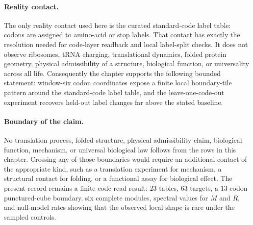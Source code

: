 \paragraph{Reality contact.} The only reality contact used here is the curated standard-code label table: codons are assigned to amino-acid or stop labels. That contact has exactly the resolution needed for code-layer readback and local label-split checks. It does not observe ribosomes, tRNA charging, translational dynamics, folded protein geometry, physical admissibility of a structure, biological function, or universality across all life. Consequently the chapter supports the following bounded statement: window-six codon coordinates expose a finite local boundary-tile pattern around the standard-code label table, and the leave-one-code-out experiment recovers held-out label changes far above the stated baseline.

\paragraph{Boundary of the claim.} No translation process, folded structure, physical admissibility claim, biological function, mechanism, or universal biological law follows from the rows in this chapter. Crossing any of those boundaries would require an additional contact of the appropriate kind, such as a translation experiment for mechanism, a structural contact for folding, or a functional assay for biological effect. The present record remains a finite code-read result: $23$ tables, $63$ targets, a $13$-codon punctured-cube boundary, six complete modules, spectral values for $M$ and $R$, and null-model rates showing that the observed local shape is rare under the sampled controls.